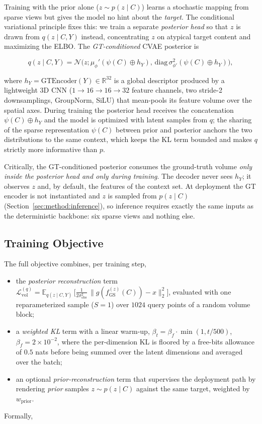 Training with the prior alone ($z\sim p(z\mid C)$) learns a stochastic
mapping from sparse views but gives the model no hint about the
\emph{target}. The conditional variational principle fixes this: we
train a separate \emph{posterior head} so that $z$ is drawn from
$q(z\mid C, Y)$ instead, concentrating $z$ on atypical target content
and maximizing the ELBO. The \emph{GT-conditioned} CVAE posterior
is

\begin{equation}
    q(z\mid C, Y) = \mathcal{N}\big(z; \mu_\phi'(\psi(C)\oplus h_Y), \,
        \mathrm{diag}\,\sigma_{\phi'}^2(\psi(C)\oplus h_Y)\big),
    \label{eq:posterior}
\end{equation}

where $h_Y=\mathrm{GTEncoder}(Y)\in\mathbb{R}^{32}$ is a global
descriptor produced by a lightweight 3D CNN ($1\to16\to16\to32$ feature
channels, two stride-2 downsamplings, GroupNorm, SiLU) that mean-pools
its feature volume over the spatial axes. During training the posterior
head receives the concatenation $\psi(C)\oplus h_Y$ and the model is
optimized with latent samples from $q$; the sharing of the sparse
representation $\psi(C)$ between prior and posterior anchors the two
distributions to the same context, which keeps the KL term bounded and
makes $q$ strictly more informative than $p$.

Critically, the GT-conditioned posterior consumes the ground-truth
volume \emph{only inside the posterior head and only during training}.
The decoder never sees $h_Y$; it observes $z$ and, by default, the
features of the context set. At deployment the GT encoder is not
instantiated and $z$ is sampled from $p(z\mid C)$
(Section~\ref{sec:method:inference}), so inference requires exactly the
same inputs as the deterministic backbone: six sparse views and nothing
else.

\subsection{Training Objective}
\label{sec:method:loss}

The full objective combines, per training step,
\begin{itemize}
\item the \emph{posterior reconstruction} term
      $\mathcal{L}_{\mathrm{vol}}^{(q)}=\mathbb{E}_{q(z\mid C,Y)}\,
      \big[\tfrac{1}{2\sigma_{\mathrm{obs}}^2}\,\|g(f_{\mathrm{GS}}^{(z)}(C))-x\|_2^2\big]$,
      evaluated with one reparameterized sample ($S=1$) over $1024$
      query points of a random volume block;
\item a \emph{weighted KL} term with a linear warm-up,
      $\beta_t = \beta_f\cdot\min(1, t/500)$, $\beta_f = 2\times10^{-2}$,
      where the per-dimension KL is floored by a free-bits allowance of
      $0.5$ nats \cite{kingma2016freebits} before being summed over the
      latent dimensions and averaged over the batch;
\item an optional \emph{prior-reconstruction} term that supervises the
      deployment path by rendering \emph{prior} samples
      $z\sim p(z\mid C)$ against the same target, weighted by
      $w_{\mathrm{prior}}$.
\end{itemize}
Formally,

